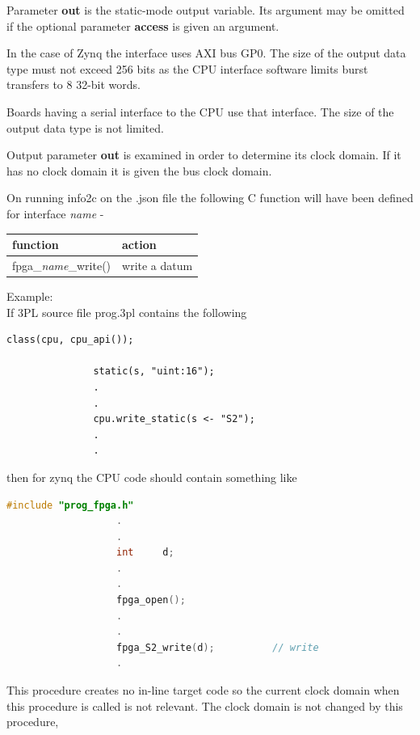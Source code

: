             Parameter {\bf out} is the static-mode output variable. Its argument
            may be omitted if the optional parameter {\bf access} is given an argument.
            
            In the case of Zynq the interface uses AXI bus GP0.            
            The size of the output data type must not exceed 256 bits as the CPU
            interface software limits burst transfers to 8 32-bit words.
            
            Boards having a serial interface to the CPU use that interface.
            The size of the output data type is not limited.

            Output parameter {\bf out} is examined in order to determine its clock
            domain. If it has no clock domain it is given the bus clock domain.

            On running info2c on the .json file the following C function will
            have been defined for interface {\em name} -
            
            \begin{tabular}{| l | l |}
            \hline
            function                   & action         \\ \hline \hline
            fpga\_{\em name}\_write()  & write a datum  \\ \hline
            \end{tabular}
            
            Example: \\
            If 3PL source file prog.3pl contains the following \\
            \begin{lstlisting}[gobble=12, language=threepl]
               class(cpu, cpu_api());
               
               static(s, "uint:16");
               .
               .
               cpu.write_static(s <- "S2");
               .
               .
            \end{lstlisting}
            then for zynq the CPU code should contain something like \\
            \begin{lstlisting}[gobble=12, language=C]
                   #include "prog_fpga.h"
                   .
                   .
                   int     d;
                   .
                   .
                   fpga_open();
                   .
                   .
                   fpga_S2_write(d);          // write
                   .
            \end{lstlisting}

            This procedure creates no in-line target code so the current clock domain
            when this procedure is called is not relevant. The clock domain is not
            changed by this procedure,

